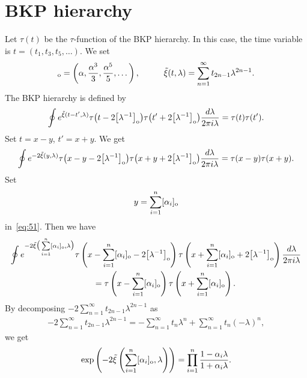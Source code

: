 \section{BKP hierarchy}\label{section4}

Let $\tau(t)$ be the $\tau$-function of the BKP hierarchy.
In this case, the time variable is $t=(t_1,t_3,t_5,\dots)$.
We set
\begin{gather*}
[\alpha]_{\rm o}=\left(\alpha,\frac{\alpha^3}{3},\frac{\alpha^5}{5},\dots\right),\hskip1cm\tilde{\xi}
(t,\lambda)=\sum_{n=1}^{\infty}t_{2n-1}\lambda^{2n-1}.
\end{gather*}
The BKP hierarchy \cite{DJKM1,JM1} is def\/ined by
\begin{gather}
\oint e^{\tilde{\xi}(t-t',\lambda)}\tau\big(t-2\big[\lambda^{-1}\big]_{\rm o}\big)\tau\big(t'+2\big[\lambda^{-1}\big]_{\rm o}\big)\frac{d\lambda}
{2\pi i\lambda}=\tau(t)\tau(t').
\label{eq:50}
\end{gather}
Set $t=x-y$, $t'=x+y$.
We get
\begin{gather}
\oint e^{-2\tilde{\xi}(y,\lambda)}\tau\big(x-y-2\big[\lambda^{-1}\big]_{\rm o}\big)\tau\big(x+y+2\big[\lambda^{-1}\big]_{\rm o}\big)\frac{d\lambda}
{2\pi i\lambda}=\tau(x-y)\tau(x+y).
\label{eq:51}
\end{gather}
Set
\begin{gather*}
y=\sum_{i=1}^{n} [\alpha_i]_{\rm o}
\end{gather*}
in~\eqref{eq:51}. Then we have
\begin{gather*}%
\oint e^{-2\tilde{\xi}\big(\sum\limits_{i=1}^{n} [\alpha_i]_{\rm o},\lambda\big)}\tau\left(x-\sum_{i=1}^{n}
 [\alpha_i]_{\rm o}-2\big[\lambda^{-1}\big]_{\rm o}\right)
\tau\left(x+\sum_{i=1}^{n} [\alpha_i]_{\rm o}+2\big[\lambda^{-1}\big]_{\rm o}\right)\frac{d\lambda}{2\pi i\lambda}
\\
\qquad
{}=\tau\left(x-\sum_{i=1}^{n} [\alpha_i]_{\rm o}\right)\tau\left(x+\sum_{i=1}^{n} [\alpha_i]_{\rm o}\right).
\end{gather*}
By decomposing $-2\sum\limits_{n=1}^\infty t_{2n-1}{\lambda}^{2n-1}$ as
\begin{gather*}
-2\sum_{n=1}^\infty t_{2n-1}{\lambda}^{2n-1}=-\sum_{n=1}^{\infty}t_n{\lambda}^n+\sum_{n=1}^{\infty}
t_n(-\lambda)^n,
\end{gather*}
we get
\begin{gather*}
\exp\left(-2\tilde{\xi}\left(\sum_{i=1}^{n} [\alpha_i]_{\rm o},\lambda\right)\right)=\prod_{i=1}^{n}
\frac{1-\alpha_i\lambda}{1+\alpha_i\lambda}.
\end{gather*}

